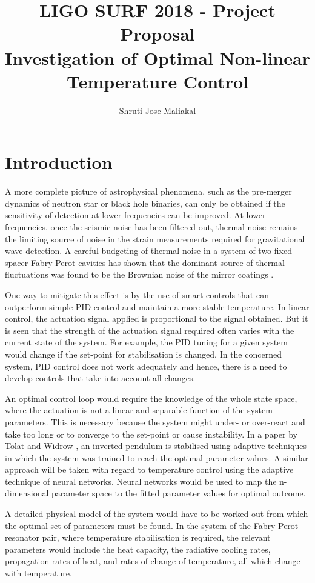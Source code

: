 \documentclass[colorlinks=true,pdfstartview=FitV,linkcolor=blue,
            citecolor=red,urlcolor=magenta]{ligodoc}
\title{LIGO SURF 2018 - Project Proposal\\ \vspace{0.5cm} \large{Investigation of Optimal Non-linear Temperature Control}}
\author{Shruti Jose Maliakal}
\begin{document}
\section{Introduction}
A more complete picture of astrophysical phenomena, such as the pre-merger dynamics of neutron star or black hole binaries, can only be obtained if the sensitivity of detection at lower frequencies can be improved. At lower frequencies, once the seismic noise has been filtered out, thermal noise remains the limiting source of noise in the strain measurements required for gravitational wave detection. A careful budgeting of thermal noise in a system of two fixed-spacer Fabry-Perot cavities has shown that the dominant source of thermal fluctuations was found to be the Brownian noise of the mirror coatings \cite{noisebudget}.

One way to mitigate this effect is by the use of smart controls that can outperform simple PID control and maintain a more stable temperature. In linear control, the actuation signal applied is proportional to the signal obtained. But it is seen that the strength of the actuation signal required often varies with the current state of the system. For example, the PID tuning for a given system would change if the set-point for stabilisation is changed. In the concerned system, PID control does not work adequately and hence, there is a need to develop controls that take into account all changes. 

An optimal control loop would require the knowledge of the whole state space, where the actuation is not a linear and separable function of the system parameters. This is necessary because the system might under- or over-react and take too long or to converge to the set-point or cause instability. In a paper by Tolat and Widrow \cite{broombalance}, an inverted pendulum is stabilised using adaptive techniques in which the system was trained to reach the optimal parameter values. A similar approach will be taken with regard to temperature control using the adaptive technique of neural networks. Neural networks would be used to map the n-dimensional parameter space to the fitted parameter values for optimal outcome. 

A detailed physical model of the system would have to be worked out from which the optimal set of parameters must be found. In the system of the Fabry-Perot resonator pair, where temperature stabilisation is required, the relevant parameters would include the heat capacity, the radiative cooling rates, propagation rates of heat, and rates of change of temperature, all which change with temperature.
\end{document}
